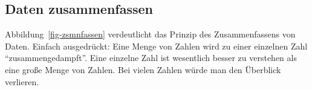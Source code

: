 \documentclass[
  letterpaper,
  twoside,
  open=any]{scrbook}
\theoremstyle{definition}
\theoremstyle{definition}
\theoremstyle{definition}
\theoremstyle{remark}
\begin{document}
\subsection{Daten zusammenfassen}\label{daten-zusammenfassen}

Abbildung~\ref{fig-zsmnfassen} verdeutlicht das Prinzip des
Zusammenfassens von Daten. Einfach ausgedrückt: Eine Menge von Zahlen
wird zu einer einzelnen Zahl \enquote{zusammengedampft}. Eine einzelne
Zahl ist wesentlich besser zu verstehen als eine große Menge von Zahlen.
Bei vielen Zahlen würde man den Überblick verlieren.

\begin{figure}

\begin{minipage}{0.45\linewidth}



\end{minipage}%
%
\begin{minipage}{0.10\linewidth}
~\end{minipage}%
%
\begin{minipage}{0.45\linewidth}

\end{minipage}
\end{figure}
\end{document}
